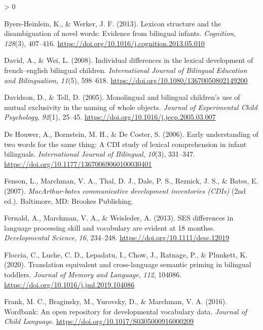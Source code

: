 \documentclass[
  english,
  ,man,floatsintext]{apa6}
\newlength{\cslhangindent}
\newenvironment{CSLReferences}[2] %
 {%
  \setlength{\parindent}{0pt}
  \ifodd #1 \everypar{\setlength{\hangindent}{\cslhangindent}}\ignorespaces\fi
  \ifnum #2 > 0
  \setlength{\parskip}{#2\baselineskip}
  \fi
 }%
 {}
\begin{document}
\begin{CSLReferences}{1}{0}
\leavevmode\hypertarget{ref-Byers-Heinlein_Werker_2013}{}%
Byers-Heinlein, K., \& Werker, J. F. (2013). Lexicon structure and the disambiguation of novel words: Evidence from bilingual infants. \emph{Cognition}, \emph{128}(3), 407--416. \url{https://doi.org/10.1016/j.cognition.2013.05.010}

\leavevmode\hypertarget{ref-David_Wei_2008}{}%
David, A., \& Wei, L. (2008). Individual differences in the lexical development of french--english bilingual children. \emph{International Journal of Bilingual Education and Bilingualism}, \emph{11}(5), 598--618. \url{https://doi.org/10.1080/13670050802149200}

\leavevmode\hypertarget{ref-Davidson_Tell_2005}{}%
Davidson, D., \& Tell, D. (2005). Monolingual and bilingual children's use of mutual exclusivity in the naming of whole objects. \emph{Journal of Experimental Child Psychology}, \emph{92}(1), 25--45. \url{https://doi.org/10.1016/j.jecp.2005.03.007}

\leavevmode\hypertarget{ref-DeHouwer_etal_2006}{}%
De Houwer, A., Bornstein, M. H., \& De Coster, S. (2006). Early understanding of two words for the same thing: A CDI study of lexical comprehension in infant bilinguals. \emph{International Journal of Bilingual}, \emph{10}(3), 331--347. \url{https://doi.org/10.1177/13670069060100030401}

\leavevmode\hypertarget{ref-Fenson_etal_2007}{}%
Fenson, L., Marchman, V. A., Thal, D. J., Dale, P. S., Reznick, J. S., \& Bates, E. (2007). \emph{MacArthur-bates communicative development inventories (CDIs)} (2nd ed.). Baltimore, MD: Brookes Publishing.

\leavevmode\hypertarget{ref-Fernald_etal_2013}{}%
Fernald, A., Marchman, V. A., \& Weisleder, A. (2013). SES differences in language processing skill and vocabulary are evident at 18 monthss. \emph{Developmental Science}, \emph{16}, 234--248. \url{https://doi.org/10.1111/desc.12019}

\leavevmode\hypertarget{ref-Floccia_etal_2020}{}%
Floccia, C., Luche, C. D., Lepadatu, I., Chow, J., Ratnage, P., \& Plunkett, K. (2020). Translation equivalent and cross-language semantic priming in bilingual toddlers. \emph{Journal of Memory and Language}, \emph{112}, 104086. \url{https://doi.org/10.1016/j.jml.2019.104086}

\leavevmode\hypertarget{ref-Frank_etal_2016}{}%
Frank, M. C., Braginsky, M., Yurovsky, D., \& Marchman, V. A. (2016). Wordbank: An open repository for developmental vocabulary data. \emph{Journal of Child Language}. \url{https://doi.org/10.1017/S0305000916000209}


\end{CSLReferences}
\end{document}

